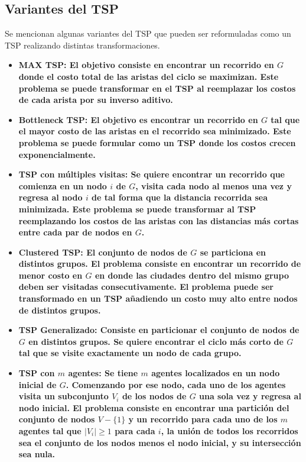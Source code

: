 \subsection*{Variantes del TSP}
Se mencionan algunas variantes del TSP que pueden ser reformuladas como un TSP realizando distintas transformaciones.
\begin{itemize}
	\item \bfseries MAX TSP\normalfont: El objetivo consiste en encontrar un recorrido en $G$ donde el costo total de las aristas del ciclo se maximizan. Este problema se puede transformar en el TSP al reemplazar los costos de cada arista por su inverso aditivo.
	\item \bfseries Bottleneck TSP\normalfont: El objetivo es encontrar un recorrido en $G$ tal que el mayor costo de las aristas en el recorrido sea minimizado. Este problema se puede formular como un TSP donde los costos crecen exponencialmente.
	\item \bfseries TSP con múltiples visitas\normalfont: Se quiere encontrar un recorrido que comienza en un nodo $i$ de $G$, visita cada nodo al menos una vez y regresa al nodo $i$ de tal forma que la distancia recorrida sea minimizada. Este problema se puede transformar al TSP reemplazando los costos de las aristas con las distancias más cortas entre cada par de nodos en $G$.
	\item \bfseries Clustered TSP\normalfont: El conjunto de nodos de $G$ se particiona en distintos grupos. El problema consiste en encontrar un recorrido de menor costo en $G$ en donde las ciudades dentro del mismo grupo deben ser visitadas consecutivamente. El problema puede ser transformado en un TSP añadiendo un costo muy alto entre nodos de distintos grupos.
	\item \bfseries TSP Generalizado\normalfont: Consiste en particionar el conjunto de nodos de $G$ en distintos grupos. Se quiere encontrar el ciclo más corto de $G$ tal que se visite exactamente un nodo de cada grupo.
	\item \bfseries TSP con $m$ agentes\normalfont: Se tiene $m$ agentes localizados en un nodo inicial de $G$. Comenzando por ese nodo, cada uno de los agentes visita un subconjunto $V_i$ de los nodos de $G$ una sola vez y regresa al nodo inicial. El problema consiste en encontrar una partición del conjunto de nodos $V - \{1\}$ y un recorrido para cada uno de los $m$ agentes tal que $|V_i|\geq1 $ para cada $i$, la unión de todos los recorridos sea el conjunto de los nodos menos el nodo inicial, y su intersección sea nula.
\end{itemize}
